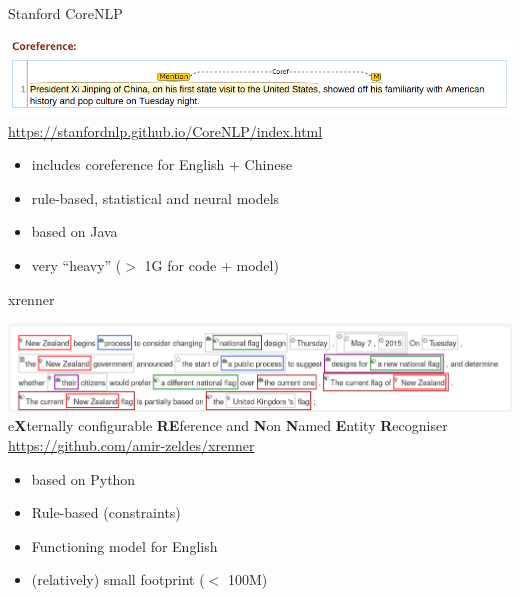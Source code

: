 \documentclass[dvipsnames, 10pt, compress]{beamer}
\begin{document}
\begin{frame}{Stanford CoreNLP}

\begin{center}
\includegraphics[width=\textwidth]{graphics/Xi-Jinping.png} \\
\url{https://stanfordnlp.github.io/CoreNLP/index.html}
\end{center}

\begin{itemize}
 \item includes coreference for English + Chinese
 \item rule-based, statistical and neural models
 \item based on Java
 \item very ``heavy'' ($>$ 1G for code + model)
\end{itemize}

\end{frame}

\begin{frame}{xrenner}

\begin{center}
\includegraphics[width=\textwidth]{graphics/xrenner.png} \\
   e\textbf{X}ternally configurable \textbf{RE}ference and \textbf{N}on \textbf{N}amed \textbf{E}ntity \textbf{R}ecogniser \\
\url{https://github.com/amir-zeldes/xrenner}

\end{center}

\begin{itemize}
  \item based on Python
  \item Rule-based (constraints)
  \item Functioning model for English
  \item (relatively) small footprint ($<$ 100M)
\end{itemize}


\end{frame}
\end{document}
